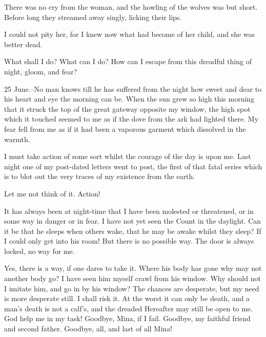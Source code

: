 There was no cry from the woman, and the howling of the wolves was but short. Before long they streamed away singly, licking their lips. 

I could not pity her, for I knew now what had become of her child, and she was better dead. 

What shall I do? What can I do? How can I escape from this dreadful thing of night, gloom, and fear? 

25 June.--No man knows till he has suffered from the night how sweet and dear to his heart and eye the morning can be. When the sun grew so high this morning that it struck the top of the great gateway opposite my window, the high spot which it touched seemed to me as if the dove from the ark had lighted there. My fear fell from me as if it had been a vaporous garment which dissolved in the warmth. 

I must take action of some sort whilst the courage of the day is upon me. Last night one of my post-dated letters went to post, the first of that fatal series which is to blot out the very traces of my existence from the earth. 

Let me not think of it. Action! 

It has always been at night-time that I have been molested or threatened, or in some way in danger or in fear. I have not yet seen the Count in the daylight. Can it be that he sleeps when others wake, that he may be awake whilst they sleep? If I could only get into his room! But there is no possible way. The door is always locked, no way for me. 

Yes, there is a way, if one dares to take it. Where his body has gone why may not another body go? I have seen him myself crawl from his window. Why should not I imitate him, and go in by his window? The chances are desperate, but my need is more desperate still. I shall risk it. At the worst it can only be death, and a man's death is not a calf's, and the dreaded Hereafter may still be open to me. God help me in my task! Goodbye, Mina, if I fail. Goodbye, my faithful friend and second father. Goodbye, all, and last of all Mina! 

